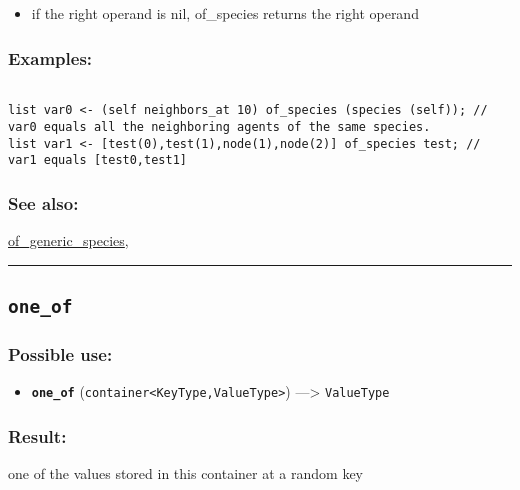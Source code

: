 \documentclass[]{book}
\providecommand{\tightlist}{%
  \setlength{\itemsep}{0pt}\setlength{\parskip}{0pt}}
\theoremstyle{definition}
\theoremstyle{definition}
\theoremstyle{definition}
\theoremstyle{remark}
\begin{document}
\begin{itemize}
\tightlist
\item
  if the right operand is nil, of\_species returns the right operand
\end{itemize}

\subsubsection{Examples:}\label{examples-262}

\begin{verbatim}
 
list var0 <- (self neighbors_at 10) of_species (species (self)); // var0 equals all the neighboring agents of the same species. 
list var1 <- [test(0),test(1),node(1),node(2)] of_species test; // var1 equals [test0,test1]
\end{verbatim}

\subsubsection{See also:}\label{see-also-150}

\href{operators-n-to-r.html\#of_generic_species}{of\_generic\_species},

\begin{center}\rule{0.5\linewidth}{\linethickness}\end{center}

\subsection{\texorpdfstring{\texttt{one\_of}}{one\_of}}\label{one_of}

\subsubsection{Possible use:}\label{possible-use-383}

\begin{itemize}
\tightlist
\item
  \textbf{\texttt{one\_of}}
  (\texttt{container\textless{}KeyType,ValueType\textgreater{}})
  ---\textgreater{} \texttt{ValueType}
\end{itemize}

\subsubsection{Result:}\label{result-369}

one of the values stored in this container at a random key
\end{document}
